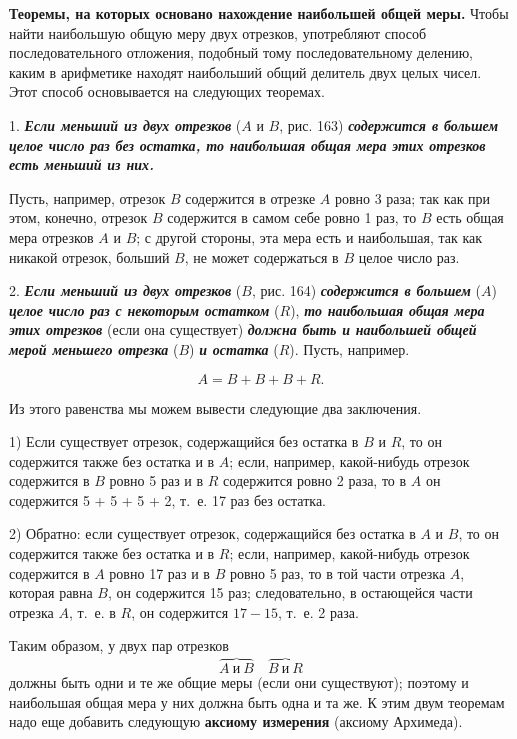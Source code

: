 \documentclass[oneside]{book}
\begin{document}
\textbf{Теоремы, на которых основано нахождение наибольшей общей меры.}
Чтобы найти наибольшую общую меру двух отрезков, употребляют способ последовательного отложения, подобный тому последовательному делению, каким в арифметике находят наибольший общий делитель двух целых чисел.
Этот способ основывается на следующих теоремах.

1.
\textbf{\emph{Если меньший из двух отрезков}} ($A$ и $B$, рис. 163) \textbf{\emph{содержится в большем целое число раз без остатка, то наибольшая общая мера этих отрезков есть меньший из них.}}

Пусть, например, отрезок $B$ содержится в отрезке $A$ ровно 3 раза;
так как при этом, конечно, отрезок $B$ содержится в самом себе ровно 1 раз, то $B$ есть общая мера отрезков $A$ и $B$;
с другой стороны, эта мера есть и наибольшая, так как никакой отрезок, больший $B$, не может содержаться в $B$ целое число раз.

2.
\textbf{\emph{Если меньший из двух отрезков}} ($B$, рис. 164) \textbf{\emph{содержится в большем}} ($A$) \textbf{\emph{целое число раз с некоторым остатком}} ($R$), \textbf{\emph{то наибольшая общая мера этих отрезков}} (если она существует) \textbf{\emph{должна быть и наибольшей общей мерой меньшего отрезка}} ($B$) \textbf{\emph{и остатка}} ($R$).
Пусть, например.

\[A=B+B+B + R.\]

Из этого равенства мы можем вывести следующие два заключения.

1) Если существует отрезок, содержащийся без остатка в $B$ и $R$, то он содержится также без остатка и в $A$;
если, например, какой-нибудь отрезок содержится в $B$ ровно 5 раз и в $R$ содержится ровно 2 раза, то в $A$ он содержится 5 + 5 + 5 + 2, т.~е. 17 раз без остатка.

2) Обратно:
если существует отрезок, содержащийся без остатка в $A$ и $B$, то он содержится также без остатка и в $R$;
если, например, какой-нибудь отрезок содержится в $A$ ровно 17 раз и в $B$ ровно 5 раз, то в той части отрезка $A$, которая равна $B$, он содержится 15 раз;
следовательно, в остающейся части отрезка $A$, т.~е. в $R$, он содержится $17-15$, т.~е. 2 раза.

Таким образом, у двух пар отрезков
\[\overbrace{A\ \text{и}\ B}\quad \overbrace{B\ \text{и}\ R}\]
должны быть одни и те же общие меры (если они существуют);
поэтому и наибольшая общая мера у них должна быть одна и та же.
К этим двум теоремам надо еще добавить следующую \textbf{аксиому измерения} (аксиому Архимеда).
\end{document}
